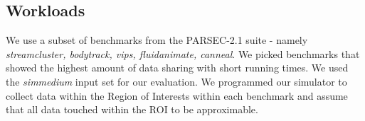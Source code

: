\subsection{Workloads}
We use a subset of benchmarks from the PARSEC-2.1 suite - namely
\emph{streamcluster, bodytrack, vips, fluidanimate, canneal}. We picked
benchmarks that showed the highest amount of data sharing with short running
times. We used the \emph{simmedium} input set for our evaluation. We programmed
our simulator to collect data within the Region of Interests within each
benchmark and assume that all data touched within the ROI to be approximable.



